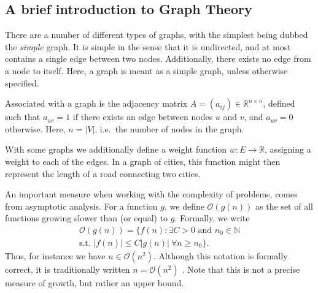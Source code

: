 \subsection{A brief introduction to Graph Theory}
There are a number of different types of graphs, with the simplest being dubbed the \textit{simple} graph.
It is simple in the sense that it is undirected, and at most contains a single edge between two nodes.
Additionally, there exists no edge from a node to itself.
Here, a graph is meant as a simple graph, unless otherwise specified.

\begin{comment}
Graphs are in their simplest form a collection of vertices, and a collection of edges connecting said vertices.
Let $V$ denote the set of vertices, and $E \subseteq \{ uv : u,v \in V \wedge u \neq v \}$.
We can then denote the simple, undirected graph as $G = (V, E)$, which by definition contains to loops from a given vertex $u$ to itself.
It is undirected in the sense that we do not assign a direction \textit{from $u$ to $v$}, but rather simply that there is a connection.
\end{comment}

Associated with a graph is the adjacency matrix $A = (a_{ij}) \in \mathbb{R}^{n \times n}$, defined such that $a_{uv} = 1$ if there exists an edge between nodes $u$ and $v$, and $a_{uv} = 0$ otherwise.
Here, $n = |V|$, i.e.\ the number of nodes in the graph.

With some graphs we additionally define a weight function $w: E \to \mathbb{R}$, assigning a weight to each of the edges.
In a graph of cities, this function might then represent the length of a road connecting two cities.

An important measure when working with the complexity of problems, comes from asymptotic analysis.
For a function $g$, we define $\mathcal{O}(g(n))$ as the set of all functions growing slower than (or equal) to $g$. Formally, we write
\begin{multline}
    \mathcal{O}(g(n)) = \{ f(n) : \exists C > 0 \text{ and } n_0 \in \mathbb{N} \\
    \text{s.t. } |f(n)| \leq C |g(n)| \ \forall n \geq n_0 \}.
\end{multline}
Thus, for instance we have $n \in \mathcal{O}(n^2)$.
Although this notation is formally correct, it is traditionally written $n = \mathcal{O}(n^2)$ \cite[p.~100]{aigner2023discrete}.
Note that this is not a precise measure of growth, but rather an upper bound.

